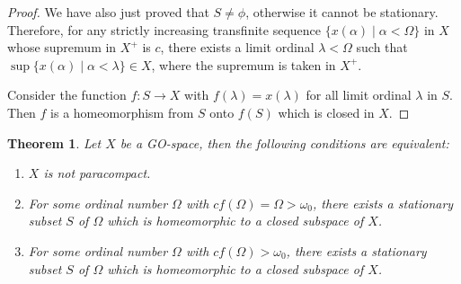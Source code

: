 \documentclass[12pt,oneside,english]{amsbook}
\numberwithin{equation}{section} %
\numberwithin{figure}{section} %
\theoremstyle{plain}
\numberwithin{section}{chapter}
\newtheorem{thm}{Theorem}[section]
\theoremstyle{plain}
\begin{document}
\begin{proof}
    We have also just proved that $S \neq \phi$, otherwise it cannot be stationary. Therefore, for any strictly increasing transfinite sequence $\{x(\alpha) \; | \; \alpha < \Omega \}$ in $X$ whose supremum in $X^+$ is $c$, there exists a limit ordinal $\lambda < \Omega$ such that $\sup{\{x(\alpha) \; | \; \alpha < \lambda \}} \in X$, where the supremum is taken in $X^+$.

    Consider the function $f: S \to X$ with $f(\lambda) = x(\lambda)$ for all limit ordinal $\lambda$ in $S$. Then $f$ is a homeomorphism from $S$ onto $f(S)$ which is closed in $X$.
\end{proof}

\begin{thm}
  Let $X$ be a GO-space, then the following conditions are equivalent:
  \begin{enumerate}
  \item $X$ is not paracompact.
  \item For some ordinal number $\Omega$ with $cf(\Omega) = \Omega > \omega_0$, there exists a stationary subset $S$ of $\Omega$ which is homeomorphic to a closed subspace of $X$.
  \item  For some ordinal number $\Omega$ with $cf(\Omega) > \omega_0$, there exists a stationary subset $S$ of $\Omega$ which is homeomorphic to a closed subspace of $X$.
  \end{enumerate}
\end{thm}
\end{document}
